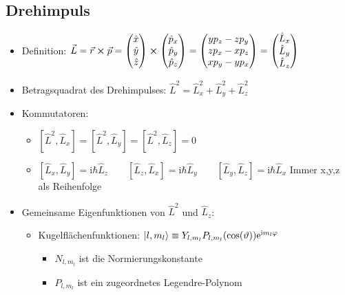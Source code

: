 \documentclass[a4paper,11pt]{article}
\newcommand{\ii}{\mathrm{i}}
\newcommand{\hb}{\hbar}
\begin{document}
\subsection*{Drehimpuls}

\begin{itemize}
  \item Definition: $\vec{L} = \vec{r} \cross \vec{p}
  = \begin{pmatrix} \hat{x} \\ \hat{y} \\ \hat{z} \end{pmatrix} \cross \begin{pmatrix} \hat{p}_x \\ \hat{p}_y \\ \hat{p}_z \end{pmatrix}
  = \begin{pmatrix} yp_z - zp_y \\ zp_x - xp_z \\ xp_y - yp_x \end{pmatrix}
  = \begin{pmatrix} \hat{L}_x \\ \hat{L}_y \\ \hat{L}_z \end{pmatrix} $ 
  \item Betragsquadrat des Drehimpulses: $\hat{L}^2 = \hat{L}_x^2 + \hat{L}_y^2 + \hat{L}_z^2$
  \item Kommutatoren:
  \begin{itemize}
    \item $[\hat{L}^2, \hat{L}_x] = [\hat{L}^2, \hat{L}_y] = [\hat{L}^2, \hat{L}_z] = 0$
    \item $[\hat{L}_x, \hat{L}_y] = \ii\hb\hat{L}_z \qquad [\hat{L}_z, \hat{L}_x] = \ii\hb\hat{L}_y \qquad [\hat{L}_y, \hat{L}_z] = \ii\hb\hat{L}_x$ \qquad \footnotesize{Immer x,y,z als Reihenfolge}
  \end{itemize}
  \item Gemeinsame Eigenfunktionen von $\hat{L}^2$ und $\hat{L}_z$:
  \begin{itemize}
    \item Kugelflächenfunktionen: $\ket{l, m_l} \equiv Y_{l, m_l}P_{l,m_l}(\cos(\vartheta))\mathrm{e}^{\ii m_l \varphi}$
    \begin{itemize}
      \item $N_{l,m_l}$ ist die Normierungskonstante
      \item $P_{l,m_l}$ ist ein zugeordnetes Legendre-Polynom
    \end{itemize}

\end{itemize}
\end{itemize}
\end{document}
